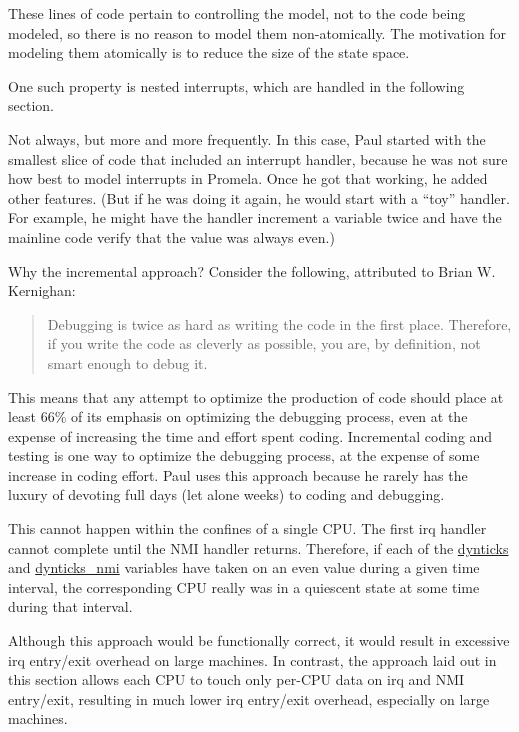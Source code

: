	These lines of code pertain to controlling the
	model, not to the code being modeled, so there is no reason to
	model them non-atomically.
	The motivation for modeling them atomically is to reduce the size
	of the state space.


	One such property is nested interrupts,
	which are handled in the following section.


	Not always, but more and more frequently.
	In this case, Paul started with the smallest slice of code that included
	an interrupt handler, because he was not sure how best to model interrupts
	in Promela.
	Once he got that working, he added other features.
	(But if he was doing it again, he would start with a ``toy'' handler.
	For example, he might have the handler increment a variable twice and
	have the mainline code verify that the value was always even.)

	Why the incremental approach?
	Consider the following, attributed to Brian W. Kernighan:

	\begin{quote}
		Debugging is twice as hard as writing the code in the first
		place. Therefore, if you write the code as cleverly as possible,
		you are, by definition, not smart enough to debug it.
	\end{quote}

	This means that any attempt to optimize the production of code should
	place at least 66\% of its emphasis on optimizing the debugging process,
	even at the expense of increasing the time and effort spent coding.
	Incremental coding and testing is one way to optimize the debugging
	process, at the expense of some increase in coding effort.
	Paul uses this approach because he rarely has the luxury of
	devoting full days (let alone weeks) to coding and debugging.


	This cannot happen within the confines of a single CPU.
	The first irq handler cannot complete until the NMI handler
	returns.
	Therefore, if each of the \url{dynticks} and \url{dynticks_nmi}
	variables have taken on an even value during a given time
	interval, the corresponding CPU really was in a quiescent
	state at some time during that interval.


	Although this approach would be functionally correct, it
	would result in excessive irq entry/exit overhead on
	large machines.
	In contrast, the approach laid out in this section allows
	each CPU to touch only per-CPU data on irq and NMI entry/exit,
	resulting in much lower irq entry/exit overhead, especially
	on large machines.

